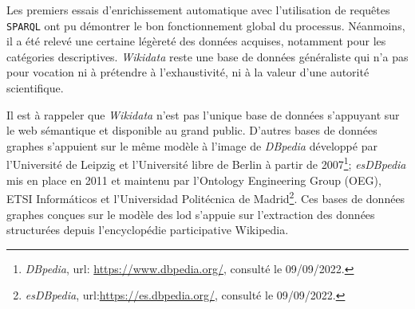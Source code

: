 	Les premiers essais d'enrichissement automatique avec l'utilisation de requêtes \texttt{SPARQL} ont pu démontrer le bon fonctionnement global du processus. Néanmoins, il a été relevé une certaine légèreté des données acquises, notamment pour les catégories descriptives. \textit{Wikidata} reste une base de données généraliste qui n'a pas pour vocation ni à prétendre à l'exhaustivité, ni à la valeur d'une autorité scientifique.
	
	Il est à rappeler que \textit{Wikidata} n'est pas l'unique base de données s'appuyant sur le web sémantique et disponible au grand public. D'autres bases de données graphes s'appuient sur le même modèle à l'image de \textit{DBpedia} développé par l'Université de Leipzig et l'Université libre de Berlin à partir de 2007\footnote{\textit{DBpedia}, url: \url{https://www.dbpedia.org/}, consulté le 09/09/2022.}; \textit{esDBpedia} mis en place en 2011 et maintenu par l'Ontology Engineering Group (OEG), ETSI Informáticos et l'Universidad Politécnica de Madrid\footnote{\textit{esDBpedia}, url:\url{https://es.dbpedia.org/}, consulté le 09/09/2022.}. Ces bases de données graphes conçues sur le modèle des \gls{lod} s'appuie sur l'extraction des données structurées depuis l'encyclopédie participative Wikipedia. 
	

